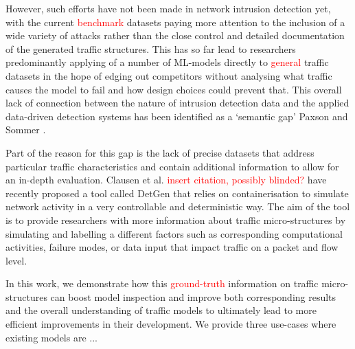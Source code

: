 \documentclass[sigconf]{acmart}
\begin{document}
However, such efforts have not been made in network intrusion detection yet, with the current \textcolor{red}{benchmark} datasets paying more attention to the inclusion of a wide variety of attacks rather than the close control and detailed documentation of the generated traffic structures. This has so far lead to researchers predominantly applying of a number of ML-models directly to \textcolor{red}{general} traffic datasets in the hope of edging out competitors without analysing what traffic causes the model to fail and how design choices could prevent that. This overall lack of connection between the nature of intrusion detection data and the applied data-driven detection systems has been identified as a `semantic gap' Paxson and Sommer \cite{sommer2010outside}.

Part of the reason for this gap is the lack of precise datasets that address particular traffic characteristics and contain additional information to allow for an in-depth evaluation. Clausen et al. \textcolor{red}{insert citation, possibly blinded?} have recently proposed a tool called DetGen that relies on containerisation to simulate network activity in a very controllable and deterministic way. The aim of the tool is to provide researchers with more information about traffic micro-structures by simulating and labelling a different factors such as corresponding computational activities, failure modes, or data input that impact traffic on a packet and flow level. 

In this work, we demonstrate how this \textcolor{red}{ground-truth} information on traffic micro-structures can boost model inspection and improve both corresponding results and the overall understanding of traffic models to ultimately lead to more efficient improvements in their development. We provide three use-cases where existing models are ...





\end{document}
